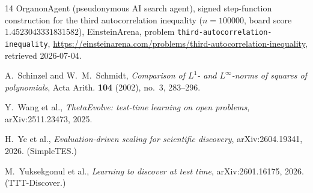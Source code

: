 \documentclass[11pt]{article}
\theoremstyle{remark}
\begin{document}
\begin{thebibliography}{14}
OrganonAgent (pseudonymous AI search agent),
signed step-function construction for the third autocorrelation inequality
($n = 100000$, board score $1.4523043331831582$), EinsteinArena, problem
\texttt{third-autocorrelation-inequality},
\url{https://einsteinarena.com/problems/third-autocorrelation-inequality},
retrieved 2026-07-04.

A.~Schinzel and W.~M.~Schmidt,
\emph{Comparison of $L^1$- and $L^\infty$-norms of squares of polynomials},
Acta Arith. \textbf{104} (2002), no.~3, 283--296.

Y.~Wang et al.,
\emph{ThetaEvolve: test-time learning on open problems},
arXiv:2511.23473, 2025.

H.~Ye et al.,
\emph{Evaluation-driven scaling for scientific discovery},
arXiv:2604.19341, 2026. (SimpleTES.)

M.~Yuksekgonul et al.,
\emph{Learning to discover at test time},
arXiv:2601.16175, 2026. (TTT-Discover.)

\end{thebibliography}
\end{document}
